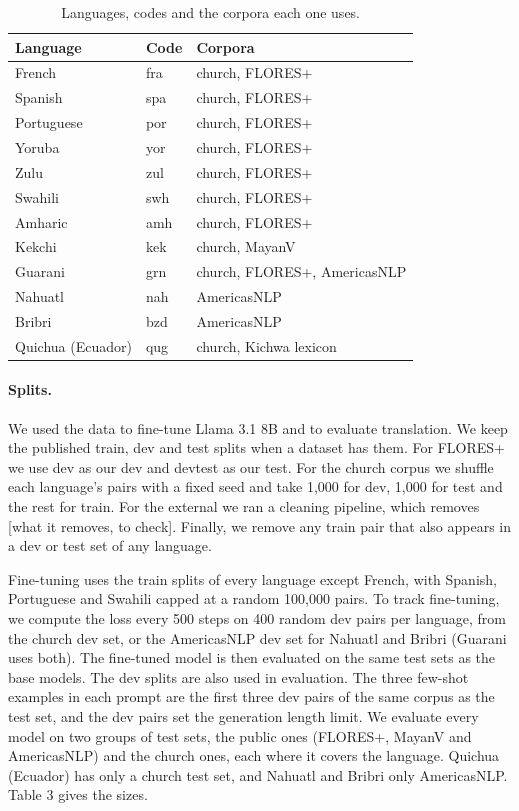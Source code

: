 \documentclass[11pt]{article}
\begin{document}
\begin{table}[htbp]
\centering
\small
\begin{tabular}{lll}
\toprule
Language & Code & Corpora \\
\midrule
French & fra & church, FLORES+ \\
Spanish & spa & church, FLORES+ \\
Portuguese & por & church, FLORES+ \\
Yoruba & yor & church, FLORES+ \\
Zulu & zul & church, FLORES+ \\
Swahili & swh & church, FLORES+ \\
Amharic & amh & church, FLORES+ \\
Kekchi & kek & church, MayanV \\
Guarani & grn & church, FLORES+, AmericasNLP \\
Nahuatl & nah & AmericasNLP \\
Bribri & bzd & AmericasNLP \\
Quichua (Ecuador) & qug & church, Kichwa lexicon \\
\bottomrule
\end{tabular}
\caption{Languages, codes and the corpora each one uses.}
\end{table}

\paragraph{Splits.} We used the data to fine-tune Llama 3.1 8B and to evaluate translation. We keep the published train, dev and test splits when a dataset has them. For FLORES+ we use dev as our dev and devtest as our test. For the church corpus we shuffle each language's pairs with a fixed seed and take 1,000 for dev, 1,000 for test and the rest for train. For the external we ran a cleaning pipeline, which removes [what it removes, to check]. Finally, we remove any train pair that also appears in a dev or test set of any language.

Fine-tuning uses the train splits of every language except French, with Spanish, Portuguese and Swahili capped at a random 100,000 pairs. To track fine-tuning, we compute the loss every 500 steps on 400 random dev pairs per language, from the church dev set, or the AmericasNLP dev set for Nahuatl and Bribri (Guarani uses both). The fine-tuned model is then evaluated on the same test sets as the base models. The dev splits are also used in evaluation. The three few-shot examples in each prompt are the first three dev pairs of the same corpus as the test set, and the dev pairs set the generation length limit. We evaluate every model on two groups of test sets, the public ones (FLORES+, MayanV and AmericasNLP) and the church ones, each where it covers the language. Quichua (Ecuador) has only a church test set, and Nahuatl and Bribri only AmericasNLP. Table 3 gives the sizes.
\end{document}

